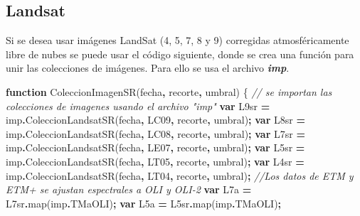 \documentclass[
]{book}
\newenvironment{Shaded}{\begin{snugshade}}{\end{snugshade}}
\newcommand{\AttributeTok}[1]{\textcolor[rgb]{0.77,0.63,0.00}{#1}}
\newcommand{\CommentTok}[1]{\textcolor[rgb]{0.56,0.35,0.01}{\textit{#1}}}
\newcommand{\FunctionTok}[1]{\textcolor[rgb]{0.00,0.00,0.00}{#1}}
\newcommand{\KeywordTok}[1]{\textcolor[rgb]{0.13,0.29,0.53}{\textbf{#1}}}
\newcommand{\NormalTok}[1]{#1}
\newcommand{\OperatorTok}[1]{\textcolor[rgb]{0.81,0.36,0.00}{\textbf{#1}}}
\newcommand{\StringTok}[1]{\textcolor[rgb]{0.31,0.60,0.02}{#1}}
\begin{document}
\hypertarget{landsat}{%
\subsection{Landsat}\label{landsat}}

Si se desea usar imágenes LandSat (4, 5, 7, 8 y 9) corregidas atmosféricamente libre de nubes se puede usar el código siguiente, donde se crea una función para unir las colecciones de imágenes. Para ello se usa el archivo \textbf{\emph{imp}}.

\begin{Shaded}
\begin{Highlighting}[]
\KeywordTok{function} \FunctionTok{ColeccionImagenSR}\NormalTok{(fecha}\OperatorTok{,}\NormalTok{ recorte}\OperatorTok{,}\NormalTok{ umbral)}
\NormalTok{\{}
  \CommentTok{// se importan las colecciones de imagenes usando el archivo "imp"}
  \KeywordTok{var}\NormalTok{ L9sr }\OperatorTok{=}\NormalTok{ imp}\OperatorTok{.}\FunctionTok{ColeccionLandsatSR}\NormalTok{(fecha}\OperatorTok{,} \StringTok{\textquotesingle{}LC09\textquotesingle{}}\OperatorTok{,}\NormalTok{ recorte}\OperatorTok{,}\NormalTok{ umbral)}\OperatorTok{;}
  \KeywordTok{var}\NormalTok{ L8sr }\OperatorTok{=}\NormalTok{ imp}\OperatorTok{.}\FunctionTok{ColeccionLandsatSR}\NormalTok{(fecha}\OperatorTok{,} \StringTok{\textquotesingle{}LC08\textquotesingle{}}\OperatorTok{,}\NormalTok{ recorte}\OperatorTok{,}\NormalTok{ umbral)}\OperatorTok{;}
  \KeywordTok{var}\NormalTok{ L7sr }\OperatorTok{=}\NormalTok{ imp}\OperatorTok{.}\FunctionTok{ColeccionLandsatSR}\NormalTok{(fecha}\OperatorTok{,} \StringTok{\textquotesingle{}LE07\textquotesingle{}}\OperatorTok{,}\NormalTok{ recorte}\OperatorTok{,}\NormalTok{ umbral)}\OperatorTok{;}
  \KeywordTok{var}\NormalTok{ L5sr }\OperatorTok{=}\NormalTok{ imp}\OperatorTok{.}\FunctionTok{ColeccionLandsatSR}\NormalTok{(fecha}\OperatorTok{,} \StringTok{\textquotesingle{}LT05\textquotesingle{}}\OperatorTok{,}\NormalTok{ recorte}\OperatorTok{,}\NormalTok{ umbral)}\OperatorTok{;}
  \KeywordTok{var}\NormalTok{ L4sr }\OperatorTok{=}\NormalTok{ imp}\OperatorTok{.}\FunctionTok{ColeccionLandsatSR}\NormalTok{(fecha}\OperatorTok{,} \StringTok{\textquotesingle{}LT04\textquotesingle{}}\OperatorTok{,}\NormalTok{ recorte}\OperatorTok{,}\NormalTok{ umbral)}\OperatorTok{;}
  \CommentTok{//Los datos de ETM y ETM+ se ajustan espectrales a OLI y OLI{-}2 }
  \KeywordTok{var}\NormalTok{ L7a }\OperatorTok{=}\NormalTok{ L7sr}\OperatorTok{.}\FunctionTok{map}\NormalTok{(imp}\OperatorTok{.}\AttributeTok{TMaOLI}\NormalTok{)}\OperatorTok{;}
  \KeywordTok{var}\NormalTok{ L5a }\OperatorTok{=}\NormalTok{ L5sr}\OperatorTok{.}\FunctionTok{map}\NormalTok{(imp}\OperatorTok{.}\AttributeTok{TMaOLI}\NormalTok{)}\OperatorTok{;}

\end{Highlighting}
\end{Shaded}
\end{document}
